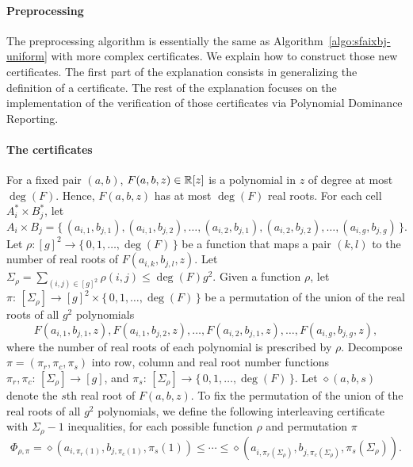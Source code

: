 \paragraph{Preprocessing}
The preprocessing algorithm is essentially the same as
Algorithm~\ref{algo:sfaixbj-uniform} with more complex certificates. We explain how to
construct those new certificates. The first part of the explanation consists in
generalizing the definition of a certificate. The rest of the
explanation focuses on the implementation of the verification of those
certificates via Polynomial Dominance Reporting.

\paragraph{The certificates}
For a fixed pair $(a,b)$, $F(a,b,z) \in \mathbb{R}[z]$ is a polynomial in $z$ of
degree at most $\deg(F)$. Hence, $F(a,b,z)$ has at most $\deg(F)$ real roots.
For each cell $A_i^* \times B_j^*$, let
\begin{displaymath}
	A_i\times B_j=\{\,
		(a_{i,1},b_{j,1}),
		(a_{i,1},b_{j,2}),
		\ldots,
		(a_{i,2},b_{j,1}),
		(a_{i,2},b_{j,2}),
		\ldots,
		(a_{i,g},b_{j,g})
	\,\}.
\end{displaymath}
Let $\rho
\colon {[g]}^2 \to \{\,0,1,\ldots,\deg(F)\,\}$ be a function that maps a pair $(k,l)$ to the
number of real roots of $F(a_{i,k},b_{j,l},z)$. Let $\Sigma_\rho = \sum_{(i,j)
\in {[g]}^2} \rho(i,j) \le \deg(F) g^2$.
Given a function $\rho$, let
$\pi\colon\,[\Sigma_\rho]\to {[g]}^2 \times
\{\,0,1,\ldots,\deg(F)\,\}$ be a permutation of the union of the real roots of all
$g^2$ polynomials
\begin{displaymath}
F(a_{i,1},b_{j,1},z),
F(a_{i,1},b_{j,2},z),
\ldots,
F(a_{i,2},b_{j,1},z),
\ldots,
F(a_{i,g},b_{j,g},z),
\end{displaymath}
where the number of real roots of each polynomial is
prescribed by $\rho$.
Decompose $\pi = (\pi_r,\pi_c,\pi_s)$ into
row,
column and real root number functions $\pi_r,\pi_c\colon\,[\Sigma_\rho]\to[g]$,
and $\pi_s\colon\,[\Sigma_\rho]\to\{\,0,1,\ldots,\deg(F)\,\}$.
Let $\diamond(a,b,s)$ denote the $s$th real root of $F(a,b,z)$.
To fix the permutation of the union of the real roots of all
$g^2$ polynomials, we define the following
interleaving certificate with $\Sigma_\rho - 1$ inequalities, for each possible
function $\rho$ and permutation $\pi$
\begin{displaymath}
	\Phi_{\rho,\pi} =
	\diamond(a_{i,\pi_r(1)},b_{j,\pi_c(1)},\pi_s(1))
	\le
	\cdots
	\le
	\diamond(a_{i,\pi_r(\Sigma_\rho)},b_{j,\pi_c(\Sigma_\rho)},\pi_s(\Sigma_\rho)).
\end{displaymath}
